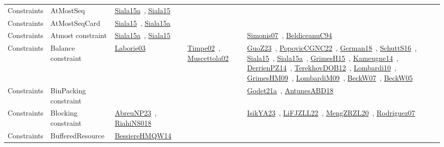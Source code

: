 {\begin{longtable}{lp{3cm}>{\raggedright\arraybackslash}p{6cm}>{\raggedright\arraybackslash}p{6cm}>{\raggedright\arraybackslash}p{8cm}}
Constraints & AtMostSeq & \href{../works/Siala15a.pdf}{Siala15a}~\cite{Siala15a}, \href{../works/Siala15.pdf}{Siala15}~\cite{Siala15} &  & \\
Constraints & AtMostSeqCard & \href{../works/Siala15.pdf}{Siala15}~\cite{Siala15}, \href{../works/Siala15a.pdf}{Siala15a}~\cite{Siala15a} &  & \\
Constraints & Atmost constraint & \href{../works/Siala15a.pdf}{Siala15a}~\cite{Siala15a}, \href{../works/Siala15.pdf}{Siala15}~\cite{Siala15} &  & \href{../works/Simonis07.pdf}{Simonis07}~\cite{Simonis07}, \href{../works/BeldiceanuC94.pdf}{BeldiceanuC94}~\cite{BeldiceanuC94}\\
Constraints & Balance constraint & \href{../works/Laborie03.pdf}{Laborie03}~\cite{Laborie03} & \href{../works/Timpe02.pdf}{Timpe02}~\cite{Timpe02}, \href{../works/Muscettola02.pdf}{Muscettola02}~\cite{Muscettola02} & \href{../works/GuoZ23.pdf}{GuoZ23}~\cite{GuoZ23}, \href{../works/PopovicCGNC22.pdf}{PopovicCGNC22}~\cite{PopovicCGNC22}, \href{../works/German18.pdf}{German18}~\cite{German18}, \href{../works/SchuttS16.pdf}{SchuttS16}~\cite{SchuttS16}, \href{../works/Siala15.pdf}{Siala15}~\cite{Siala15}, \href{../works/Siala15a.pdf}{Siala15a}~\cite{Siala15a}, \href{../works/GrimesH15.pdf}{GrimesH15}~\cite{GrimesH15}, \href{../works/Kameugne14.pdf}{Kameugne14}~\cite{Kameugne14}, \href{../works/DerrienPZ14.pdf}{DerrienPZ14}~\cite{DerrienPZ14}, \href{../works/TerekhovDOB12.pdf}{TerekhovDOB12}~\cite{TerekhovDOB12}, \href{../works/Lombardi10.pdf}{Lombardi10}~\cite{Lombardi10}, \href{../works/GrimesHM09.pdf}{GrimesHM09}~\cite{GrimesHM09}, \href{../works/LombardiM09.pdf}{LombardiM09}~\cite{LombardiM09}, \href{../works/BeckW07.pdf}{BeckW07}~\cite{BeckW07}, \href{../works/BeckW05.pdf}{BeckW05}~\cite{BeckW05}\\
Constraints & BinPacking constraint &  &  & \href{../works/Godet21a.pdf}{Godet21a}~\cite{Godet21a}, \href{../works/AntunesABD18.pdf}{AntunesABD18}~\cite{AntunesABD18}\\
Constraints & Blocking constraint & \href{../works/AbreuNP23.pdf}{AbreuNP23}~\cite{AbreuNP23}, \href{../works/RiahiNS018.pdf}{RiahiNS018}~\cite{RiahiNS018} &  & \href{../works/IsikYA23.pdf}{IsikYA23}~\cite{IsikYA23}, \href{../works/LiFJZLL22.pdf}{LiFJZLL22}~\cite{LiFJZLL22}, \href{../works/MengZRZL20.pdf}{MengZRZL20}~\cite{MengZRZL20}, \href{../works/Rodriguez07.pdf}{Rodriguez07}~\cite{Rodriguez07}\\
Constraints & BufferedResource & \href{../works/BessiereHMQW14.pdf}{BessiereHMQW14}~\cite{BessiereHMQW14} &  & \\

\end{longtable}}
